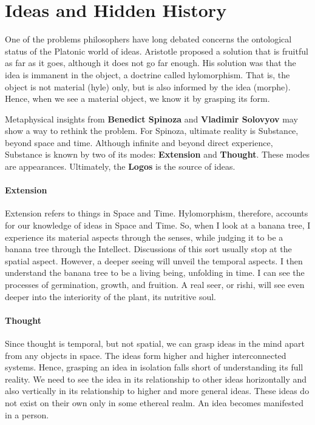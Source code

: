 \section{Ideas and Hidden History}

One of the problems philosophers have long debated concerns the ontological status of the Platonic world of ideas. Aristotle proposed a solution that is fruitful as far as it goes, although it does not go far enough. His solution was that the idea is immanent in the object, a doctrine called hylomorphism. That is, the object is not material (hyle) only, but is also informed by the idea (morphe). Hence, when we see a material object, we know it by grasping its form.

Metaphysical insights from \textbf{Benedict Spinoza} and \textbf{Vladimir Solovyov} may show a way to rethink the problem. For Spinoza, ultimate reality is Substance, beyond space and time. Although infinite and beyond direct experience, Substance is known by two of its modes: \textbf{Extension} and \textbf{Thought}. These modes are appearances. Ultimately, the \textbf{Logos} is the source of ideas.

\paragraph{Extension}
Extension refers to things in Space and Time. Hylomorphism, therefore, accounts for our knowledge of ideas in Space and Time. So, when I look at a banana tree, I experience its material aspects through the senses, while judging it to be a banana tree through the Intellect. Discussions of this sort usually stop at the spatial aspect. However, a deeper seeing will unveil the temporal aspects. I then understand the banana tree to be a living being, unfolding in time. I can see the processes of germination, growth, and fruition. A real seer, or rishi, will see even deeper into the interiority of the plant, its nutritive soul.

\paragraph{Thought}


Since thought is temporal, but not spatial, we can grasp ideas in the mind apart from any objects in space. The ideas form higher and higher interconnected systems. Hence, grasping an idea in isolation falls short of understanding its full reality. We need to see the idea in its relationship to other ideas horizontally and also vertically in its relationship to higher and more general ideas. These ideas do not exist on their own only in some ethereal realm. An idea becomes manifested in a person.

